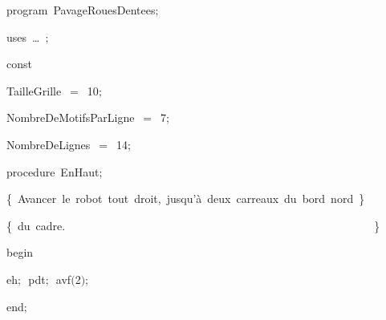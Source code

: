 
{
\parindent {}
\medskip

\carrenoir
\vspace{\neglskip}\mbox{\blc  \idt  \mcl program\idt\ PavageRouesDentees$;$
}\par 
\vspace{\neglskip}\mbox{\blc \blk\idt \mcl uses\idt \ \ldots\ $;$
}\par 
\medskip

\pagebreak[3] 
\vspace{\neglskip}\mbox{\blc  \blk\idt  \mcl const\idt \ }\par 
\vspace{\neglskip}\mbox{\blc  \blk\blk\idt  TailleGrille\ $=$\ 10$;$}\par 
\vspace{\neglskip}\mbox{\blc  \blk\blk\idt  NombreDeMotifsParLigne\ $=$\ 7$;$}\par 
\vspace{\neglskip}\mbox{\blc  \blk\blk\idt  NombreDeLignes\ $=$\ 14$;$}\par 
\medskip

\pagebreak[3] 
\vspace{\neglskip}\mbox{\blc  \blk\idt  \mcl procedure\idt \ EnHaut$;$}\par 
\vspace{\neglskip}\mbox{\blc  \blk\blk\idt  \cmt  \{\ Avancer\ le\ robot\ tout\ droit,\ jusqu{'}à\ deux\ carreaux\ du\ bord\ nord\ \}\idt }\par 
\vspace{\neglskip}\mbox{\blc  \blk\blk\idt  \cmt  \{\ du\ cadre.\ \ \ \ \ \ \ \ \ \ \ \ \ \ \ \ \ \ \ \ \ \ \ \ \ \ \ \ \ \ \ \ \ \ \ \ \ \ \ \ \ \ \ \ \ \ \ \ \ \ \ \ \ \ \ \}\idt }\par 
\vspace{\neglskip}\mbox{\blc  \blk\idt  \mcl begin\idt }\par 
\vspace{\neglskip}\mbox{\blc  \blk\blk\idt  eh$;$\ pdt$;$\ avf$($2$)$$;$}\par 
\vspace{\neglskip}\mbox{\blc  \blk\idt  \mcl end\idt $;$}\par 
\medskip

}
